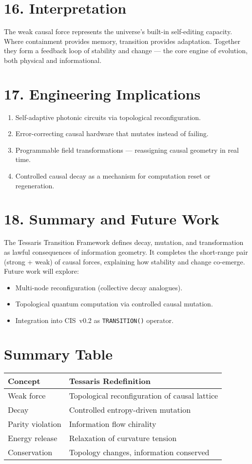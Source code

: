 \documentclass[11pt,a4paper]{article}
\begin{document}
\section{16. Interpretation}
The weak causal force represents the universe's built-in self-editing capacity.  
Where containment provides memory, transition provides adaptation.  
Together they form a feedback loop of stability and change — the core engine of evolution, both physical and informational.

\section{17. Engineering Implications}
\begin{enumerate}
\item Self-adaptive photonic circuits via topological reconfiguration.  
\item Error-correcting causal hardware that mutates instead of failing.  
\item Programmable field transformations — reassigning causal geometry in real time.  
\item Controlled causal decay as a mechanism for computation reset or regeneration.  
\end{enumerate}

\section{18. Summary and Future Work}
The Tessaris Transition Framework defines decay, mutation, and transformation as lawful consequences of information geometry.  
It completes the short-range pair (strong + weak) of causal forces, explaining how stability and change co-emerge.  
Future work will explore:
\begin{itemize}
\item Multi-node reconfiguration (collective decay analogues).  
\item Topological quantum computation via controlled causal mutation.  
\item Integration into CIS~v0.2 as \texttt{TRANSITION()} operator.  
\end{itemize}

\section*{Summary Table}
\begin{longtable}{|l|l|}
\hline
\textbf{Concept} & \textbf{Tessaris Redefinition} \\
\hline
Weak force & Topological reconfiguration of causal lattice \\
Decay & Controlled entropy-driven mutation \\
Parity violation & Information flow chirality \\
Energy release & Relaxation of curvature tension \\
Conservation & Topology changes, information conserved \\
\hline
\end{longtable}
\end{document}
